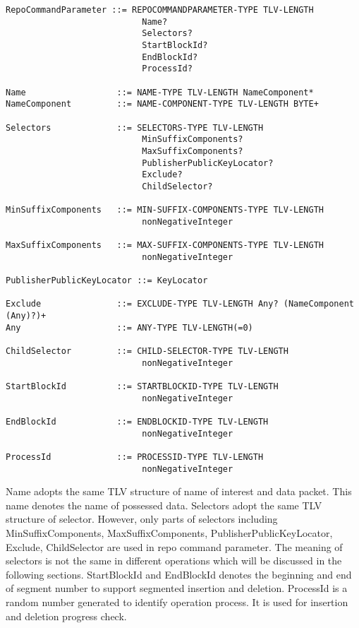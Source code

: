 \documentclass{acm_proc_article-sp}
\begin{document}
\begin{figure*}
\begin{framed}
\begin{BVerbatim}
RepoCommandParameter ::= REPOCOMMANDPARAMETER-TYPE TLV-LENGTH
                           Name?
                           Selectors?
                           StartBlockId?
                           EndBlockId?
                           ProcessId?

Name                  ::= NAME-TYPE TLV-LENGTH NameComponent*
NameComponent         ::= NAME-COMPONENT-TYPE TLV-LENGTH BYTE+

Selectors             ::= SELECTORS-TYPE TLV-LENGTH
                           MinSuffixComponents?
                           MaxSuffixComponents?
                           PublisherPublicKeyLocator?
                           Exclude?
                           ChildSelector?

MinSuffixComponents   ::= MIN-SUFFIX-COMPONENTS-TYPE TLV-LENGTH
                           nonNegativeInteger

MaxSuffixComponents   ::= MAX-SUFFIX-COMPONENTS-TYPE TLV-LENGTH
                           nonNegativeInteger

PublisherPublicKeyLocator ::= KeyLocator

Exclude               ::= EXCLUDE-TYPE TLV-LENGTH Any? (NameComponent (Any)?)+
Any                   ::= ANY-TYPE TLV-LENGTH(=0)

ChildSelector         ::= CHILD-SELECTOR-TYPE TLV-LENGTH
                           nonNegativeInteger

StartBlockId          ::= STARTBLOCKID-TYPE TLV-LENGTH
                           nonNegativeInteger

EndBlockId            ::= ENDBLOCKID-TYPE TLV-LENGTH
                           nonNegativeInteger

ProcessId             ::= PROCESSID-TYPE TLV-LENGTH
                           nonNegativeInteger
\end{BVerbatim}
\end{framed}
\end{figure*}

Name adopts the same TLV structure of name of interest and data packet. This name denotes the name of possessed data. Selectors adopt the same TLV structure of selector. However, only parts of selectors including MinSuffixComponents, MaxSuffixComponents, PublisherPublicKeyLocator, Exclude, ChildSelector are used in repo command parameter. The meaning of selectors is not the same in different operations which will be discussed in the following sections. StartBlockId and EndBlockId denotes the beginning and end of segment number to support segmented insertion and deletion. ProcessId is a random number generated to identify operation process. It is used for insertion and deletion progress check.
\end{document}
